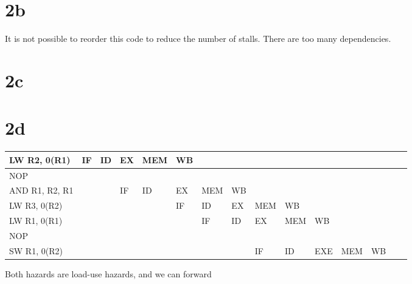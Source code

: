 \documentclass[10pt,a4paper]{article}
\begin{document}
\section*{2b}
It is not possible to reorder this code to reduce the number of stalls. There are too many dependencies.
\section*{2c}

\section*{2d}
\begin{table}[h]
	\centering
	\label{my-label}
	\begin{tabular}{|l|l|l|l|l|l|l|l|l|l|l|l|l|l|l|}
		\hline
		LW R2, 0(R1) & IF  & ID  & EX  & MEM  & WB  &  &  &  &  &  &  &  &   \\ \hline
		NOP &  &  &  &  &  &  &  &  &  &  &  &  &    \\ \hline
		AND R1, R2, R1 &  &  & IF & ID& EX  & MEM  & WB&  &  &  &  &  &    \\ \hline
		LW R3, 0(R2)&  &  &  &  &  IF & ID  & EX & MEM & WB &  &  &  &    \\ \hline
		LW R1, 0(R1)&  &  &  &  &  & IF & ID & EX & MEM  & WB  &  &  &  \\ \hline
		NOP&  &  &  &  &  &  &  &  &  &  &  &  &    \\ \hline
		SW R1, 0(R2)&  &  &  &  &  &  &  & IF & ID & EXE & MEM  & WB  &     \\ \hline
	\end{tabular}
	Both hazards are load-use hazards, and we can forward 
\end{table}
\end{document}
